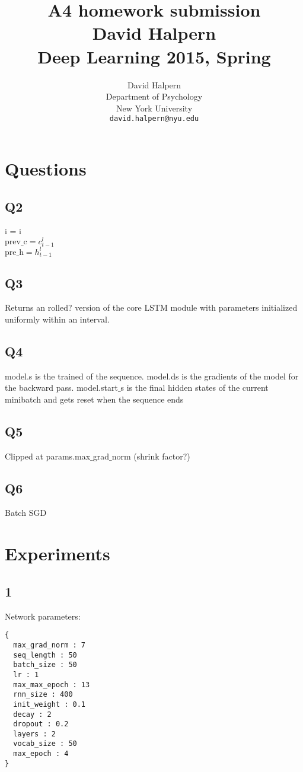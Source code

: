 \documentclass{article} %
\title{A4 homework submission \\ David Halpern \\ Deep Learning 2015, Spring}
\author{
David Halpern\\
Department of Psychology\\
New York University\\
\texttt{david.halpern@nyu.edu} \\
}
\begin{document}
\maketitle


\section{Questions}

\subsection{Q2}

i = i\\
$\text{prev\_c} = c_{t-1}^l$\\
$\text{pre\_h} = h_{t-1}^l$

\subsection{Q3}
Returns an rolled? version of the core LSTM module with parameters initialized uniformly within an interval.

\subsection{Q4}
model.s is the trained of the sequence. model.ds is the gradients of the model for the backward pass. model.start$\_$s is the final hidden states of the current minibatch and gets reset when the sequence ends

\subsection{Q5}
Clipped at params.max$\_$grad$\_$norm (shrink factor?)

\subsection{Q6}
Batch SGD

\section{Experiments}
\subsection{1} 
Network parameters:	
\begin{Verbatim}
{
  max_grad_norm : 7
  seq_length : 50
  batch_size : 50
  lr : 1
  max_max_epoch : 13
  rnn_size : 400
  init_weight : 0.1
  decay : 2
  dropout : 0.2
  layers : 2
  vocab_size : 50
  max_epoch : 4
}
\end{Verbatim}
\end{document}
